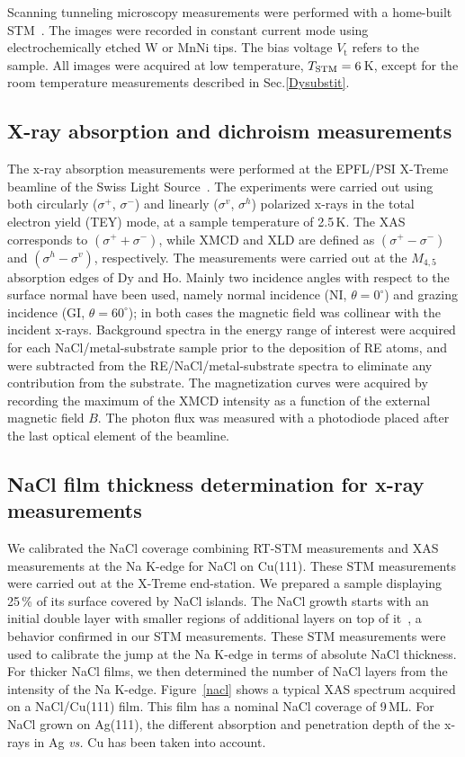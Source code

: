 Scanning tunneling microscopy measurements were performed with a home-built STM~\cite{gai92}. The images were recorded in constant current mode using electrochemically etched W or MnNi tips. The bias voltage $V_{\mathrm t}$ refers to the sample. All images were acquired at low temperature, $T_{\rm STM} = 6$\,K, except for the room temperature measurements described in Sec.\ref{Dysubstit}.


\subsection{X-ray absorption and dichroism measurements}

The x-ray absorption measurements were performed at the EPFL/PSI X-Treme beamline of the Swiss Light Source~\cite{pia12}. The experiments were carried out using both circularly ($\sigma^+$, $\sigma^-$) and linearly ($\sigma^v$, $\sigma^h$) polarized x-rays in the total electron yield (TEY) mode, at a sample temperature of 2.5\,K. The XAS corresponds to $(\sigma^+ + \sigma^-)$, while XMCD and XLD are defined as $(\sigma^+ - \sigma^-)$ and $(\sigma^h - \sigma^v)$, respectively. The measurements were carried out at the $M_{4,5}$ absorption edges of Dy and Ho. Mainly two incidence angles with respect to the surface normal have been used, namely normal incidence (NI, $\theta=0^{\circ}$) and grazing incidence (GI, $\theta=60^{\circ}$); in both cases the magnetic field was collinear with the incident x-rays. Background spectra in the energy range of interest were acquired for each NaCl/metal-substrate sample prior to the deposition of RE atoms, and were subtracted from the RE/NaCl/metal-substrate spectra to eliminate any contribution from the substrate. The magnetization curves were acquired by recording the maximum of the XMCD intensity as a function of the external magnetic field $B$. The photon flux was measured with a photodiode placed after the last optical element of the beamline.



\subsection{NaCl film thickness determination for x-ray measurements}

We calibrated the NaCl coverage combining RT-STM measurements and XAS measurements at the Na K-edge for NaCl on Cu(111). These STM measurements were carried out at the X-Treme end-station. We prepared a sample displaying 25\,\% of its surface covered by NaCl islands. The NaCl growth starts with an initial double layer with smaller regions of additional layers on top of it~\cite{rep04b}, a behavior confirmed in our STM measurements. These STM measurements were used to calibrate the jump at the Na K-edge in terms of absolute NaCl thickness. For thicker NaCl films, we then determined the number of NaCl layers from the intensity of the Na K-edge. Figure~\ref{nacl} shows a typical XAS spectrum acquired on a NaCl/Cu(111) film. This film  has a nominal NaCl coverage of 9\,ML. For NaCl grown on Ag(111), the different absorption and penetration depth of the x-rays in Ag \textit{vs.} Cu has been taken into account.


